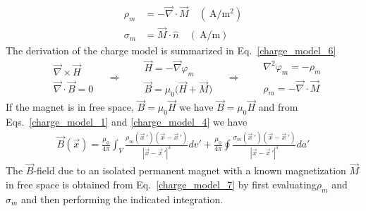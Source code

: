 \documentclass[11pt,a4paper,oneside]{book}
\numberwithin{equation}{section}
\newcommand{\abs}[1]{\left|#1\right|}
\theoremstyle{it}
\theoremstyle{definition}
\begin{document}
\begin{equation}\label{charge_model_5}
	\boxed{\begin{aligned}
			\rho_m &= -\vec{\nabla}\cdot\vec{M}\quad(\SI{}{\ampere\per\square\meter}) \\[6pt]
			\sigma_m &= \vec{M}\cdot\hat{n}\quad(\SI{}{\ampere\per\meter})
	\end{aligned}}
\end{equation}
The derivation of the charge model is summarized in Eq.~\eqref{charge_model_6}
\begin{equation}\label{charge_model_6}
\boxed{\begin{aligned}
	&\vec{\nabla}\times\vec{H} \\[6pt]
	&\vec{\nabla}\cdot\vec{B}=0
\end{aligned}}\quad\Rightarrow\quad
\boxed{\begin{aligned}
		&\vec{H}=-\vec{\nabla}\varphi_m \\[6pt]
		&\vec{B}=\mu_0\Big(\vec{H}+\vec{M}\Big)
\end{aligned}}\quad\Rightarrow\quad
\boxed{\begin{aligned}
		&\nabla^2\varphi_m=-\rho_m \\[6pt]
		&\rho_m=-\vec{\nabla}\cdot\vec{M}
\end{aligned}}
\end{equation}
If the magnet is in free space, $\vec{B}=\mu_0\vec{H}$ we have $\vec{B}=\mu_0\vec{H}$ and from Eqs.~\eqref{charge_model_1} and \ref{charge_model_4} we have
\begin{equation}\label{charge_model_7}
	\boxed{\begin{aligned}
		\vec{B}(\vec{x}) = \frac{\mu_0}{4\pi}\int_{V}\frac{\rho_m(\vec{x}\,')(\vec{x}-\vec{x}\,')}{\abs{\vec{x}-\vec{x}\,'}^3}dv'+\frac{\mu_0}{4\pi}\oint\frac{\sigma_m(\vec{x}\,')(\vec{x}-\vec{x}\,')}{\abs{\vec{x}-\vec{x}\,'}^3}da'
	\end{aligned}}
\end{equation}
The $\vec{B}$-field due to an isolated permanent magnet with a known magnetization $\vec{M}$ in free space is obtained from Eq.~\eqref{charge_model_7} by first evaluating$\rho_m$ and $\sigma_m$ and then performing the indicated integration.
\end{document}
